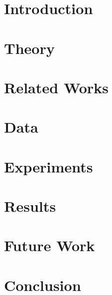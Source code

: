 \documentclass[a4paper]{article}
\begin{document}
\newpage

\setcounter{secnumdepth}{4}
\setcounter{tocdepth}{2}
\tableofcontents

\section{Introduction}


\section{Theory}






\section{Related Works}


\section{Data}





\section{Experiments}




\section{Results} \label{sec:results}


\section{Future Work}


\section{Conclusion}

\end{document}
